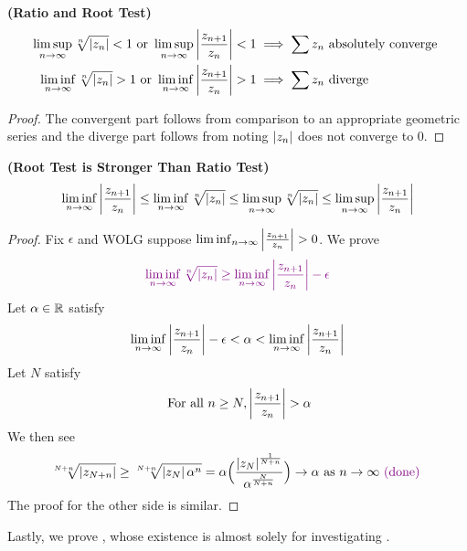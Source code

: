 \documentclass{report}
\begin{document}
\begin{theorem}
\label{Ratio and Root Test}
\textbf{(Ratio and Root Test)} 
\begin{align*}
  \limsup_{n\to\infty} \sqrt[n]{\abso{z_n}}<1 \text{ or }\limsup_{n\to\infty} \abso{\frac{z_{n+1}}{z_n}}<1&\implies \sum z_n\text{ absolutely converge }\\
  \liminf_{n\to\infty} \sqrt[n]{\abso{z_n}}>1\text{ or }\liminf_{n\to\infty} \abso{\frac{z_{n+1}}{z_n}}>1 &\implies \sum  z_n\text{ diverge }
\end{align*}
\end{theorem}
\begin{proof}
The convergent part follows from comparison to an appropriate geometric series and the diverge part follows from noting $\left|z_n\right|$ does not converge to $0$.
\end{proof}
\begin{theorem}
\textbf{(Root Test is Stronger Than Ratio Test)}
\begin{align*}
\liminf_{n\to\infty} \left|\frac{z_{n+1}}{z_n}\right|\leq \liminf_{n\to\infty} \sqrt[n]{\left|z_n\right|} \leq \limsup_{n\to\infty} \sqrt[n]{\left|z_n\right|} \leq \limsup_{n\to\infty} \left|\frac{z_{n+1}}{z_n}\right|
\end{align*}
\end{theorem}
\begin{proof}
Fix $\epsilon $ and WOLG suppose $\liminf_{n\to\infty} \abso{\frac{z_{n+1}}{z_n}}>0$. We prove 
\begin{align*}
  \textcolor{violet}{\liminf_{n\to\infty} \sqrt[n]{\left|z_n\right|}\geq \liminf_{n\to\infty} \left|\frac{z_{n+1}}{z_n}\right|-\epsilon  }
\end{align*}
Let $\alpha \in\mathbb{R} $ satisfy 
\begin{align*}
\liminf_{n\to\infty}  \left|\frac{z_{n+1}}{z_n}\right|-\epsilon <\alpha < \liminf_{n\to\infty} \left|\frac{z_{n+1}}{z_n}\right|
\end{align*}
Let $N$ satisfy  
\begin{align*}
\text{ For all }n\geq N,\abso{\frac{z_{n+1}}{z_n}}>\alpha  
\end{align*}
We then see 
\begin{align*}
  \sqrt[N+n]{\left|z_{N+n}\right|}\geq \sqrt[N+n]{\left|z_N\right|\alpha^n}=\alpha \Big(\frac{\left|z_N\right|^{\frac{1}{N+n}}}{\alpha ^{\frac{N}{N+n}}} \Big)\to \alpha \text{ as }n\to \infty \textcolor{violet}{\text{ (done) }}
\end{align*}
The proof for the other side is similar.
\end{proof}
\begin{mdframed}
Lastly, we prove , whose existence is almost solely for investigating .
\end{mdframed}
\end{document}
